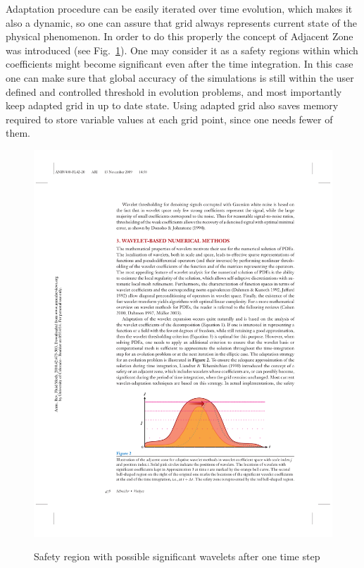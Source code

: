 Adaptation procedure can be easily iterated over time evolution, which makes it also a dynamic, so one can assure that grid always represents current state of the physical phenomenon. In order to do this properly the concept of Adjacent Zone was introduced \cite{lib:wlt_main} (see Fig.~\ref{fig:wlt_adj}). One may consider it as a safety regions within which coefficients might become significant even after the time integration. In this case one can make sure that global accuracy of the simulations is still within the user defined and controlled threshold in evolution problems, and most importantly keep adapted grid in up to date state. Using adapted grid also saves memory required to store variable values at each grid point, since one needs fewer of them.
\begin{figure}[h!]
\centering \includegraphics[scale=1]{fig/wlt_adj.pdf}\\
\caption{Safety region with possible significant wavelets after one time step \label{fig:wlt_adj}}
\end{figure}

